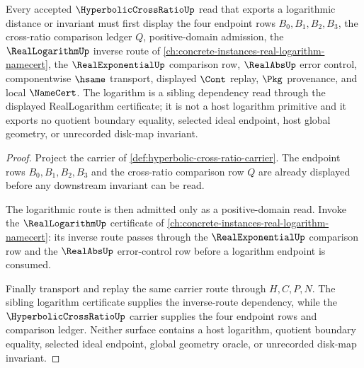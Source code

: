 \begin{theorem}
\label{thm:hyperbolic-cross-ratio-real-logarithm-route}
Every accepted $\HyperbolicCrossRatioUp$ read that exports a logarithmic distance or invariant must first display the four endpoint rows $B_0,B_1,B_2,B_3$, the cross-ratio comparison ledger $Q$, positive-domain admission, the $\RealLogarithmUp$ inverse route of \autoref{ch:concrete-instances-real-logarithm-namecert}, the $\RealExponentialUp$ comparison row, $\RealAbsUp$ error control, componentwise $\hsame$ transport, displayed $\Cont$ replay, $\Pkg$ provenance, and local $\NameCert$. The logarithm is a sibling dependency read through the displayed RealLogarithm certificate; it is not a host logarithm primitive and it exports no quotient boundary equality, selected ideal endpoint, host global geometry, or unrecorded disk-map invariant.
\end{theorem}
\begin{proof}
Project the carrier of \autoref{def:hyperbolic-cross-ratio-carrier}. The endpoint rows $B_0,B_1,B_2,B_3$ and the cross-ratio comparison row $Q$ are already displayed before any downstream invariant can be read.

The logarithmic route is then admitted only as a positive-domain read. Invoke the $\RealLogarithmUp$ certificate of \autoref{ch:concrete-instances-real-logarithm-namecert}: its inverse route passes through the $\RealExponentialUp$ comparison row and the $\RealAbsUp$ error-control row before a logarithm endpoint is consumed.

Finally transport and replay the same carrier route through $H,C,P,N$. The sibling logarithm certificate supplies the inverse-route dependency, while the $\HyperbolicCrossRatioUp$ carrier supplies the four endpoint rows and comparison ledger. Neither surface contains a host logarithm, quotient boundary equality, selected ideal endpoint, global geometry oracle, or unrecorded disk-map invariant.
\end{proof}
